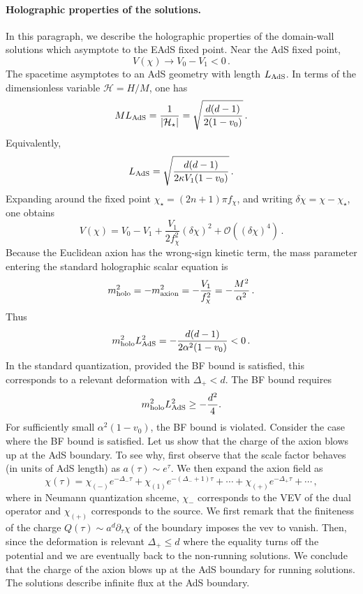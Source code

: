 \documentclass[a4paper]{article}
\begin{document}
\paragraph{Holographic properties of the solutions.}
In this paragraph, we describe the holographic properties of the domain-wall solutions which
asymptote to the EAdS fixed point. Near the AdS fixed point,
\begin{equation}
  V(\chi)\to V_0-V_1<0\,.
\end{equation}
The spacetime asymptotes to an AdS geometry with length $L_{\rm AdS}$. In terms of the
dimensionless variable $\mathcal H=H/M$, one has
\begin{equation}
  M L_{\rm AdS}
  =
  \frac{1}{|\mathcal H_\star|}
  =
  \sqrt{\frac{d(d-1)}{2(1-v_0)}}\,.
\end{equation}
Equivalently,
\begin{equation}
  L_{\rm AdS}
  =
  \sqrt{
  \frac{d(d-1)}
  {2\kappa V_1(1-v_0)}
  }\,.
\end{equation}
Expanding around the fixed point
$\chi_\star=(2n+1)\pi f_\chi$, and writing
$\delta\chi=\chi-\chi_\star$, one obtains
\begin{equation}
  V(\chi)
  =
  V_0-V_1
  +
  \frac{V_1}{2f_\chi^2}(\delta\chi)^2
  +
  \mathcal O((\delta\chi)^4)\,.
\end{equation}
Because the Euclidean axion has the wrong-sign kinetic term, the mass parameter entering the
standard holographic scalar equation is
\begin{equation}
  m_{\rm holo}^2
  =
  -m_{\rm axion}^2
  =
  -\frac{V_1}{f_\chi^2}
  =
  -\frac{M^2}{\alpha^2}\,.
\end{equation}
Thus
\begin{equation}
  m_{\rm holo}^2L_{\rm AdS}^2
  =
  -
  \frac{d(d-1)}{2\alpha^2(1-v_0)}
  <0\,.
\end{equation}
In the standard quantization, provided the BF bound is satisfied, this corresponds to a relevant
deformation with $\Delta_+<d$. The BF bound requires
\begin{equation}
  m_{\rm holo}^2L_{\rm AdS}^2\geq -\frac{d^2}{4}.
\end{equation}
For sufficiently small $\alpha^2(1-v_0)$, the BF bound is violated. Consider the case where the BF bound is satisfied.  Let us show that the charge of the axion blows up at the AdS boundary. To see why, first observe that the scale factor behaves (in units of AdS length) as $a(\tau)\sim e^{\tau}$. We then expand the axion field as
\begin{equation}
  \chi(\tau) = \chi_{(-)} e^{-\Delta_- \tau} + \chi_{(1)}e^{-\left(\Delta_- + 1\right)\tau} + \cdots + \chi_{(+)} e^{-\Delta_+ \tau} + \cdots\,,
\end{equation}
where in Neumann quantization shceme, $\chi_-$ corresponds to the VEV of the dual operator and $\chi_{(+)}$ corresponds to the source. We first remark that the finiteness of the charge $Q(\tau)\sim a^d \partial_\tau \chi$ of the boundary imposes the vev to vanish. Then, since the deformation is relevant $\Delta_+ \leq d$ where the equality turns off the potential and we are eventually back to the non-running solutions. We conclude that the charge of the axion blows up at the AdS boundary for running solutions. The solutions describe infinite flux at the AdS boundary.
\end{document}
